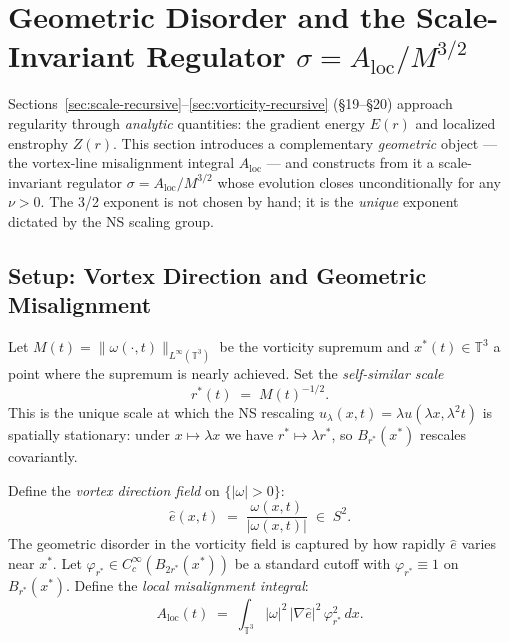 \documentclass[11pt]{article}
\theoremstyle{definition}
\theoremstyle{remark}
\newcommand{\T}{\mathbb{T}}
\begin{document}
\section{Geometric Disorder and the Scale-Invariant Regulator
         \texorpdfstring{$\sigma = A_{\mathrm{loc}}/M^{3/2}$}{sigma}}
\label{sec:sigma-regulator}

\noindent
Sections~\ref{sec:scale-recursive}--\ref{sec:vorticity-recursive} (§19--§20)
approach regularity through \emph{analytic} quantities: the gradient energy $E(r)$
and localized enstrophy $Z(r)$.  This section introduces a complementary
\emph{geometric} object — the vortex-line misalignment integral $A_{\mathrm{loc}}$
— and constructs from it a scale-invariant regulator $\sigma = A_{\mathrm{loc}}/M^{3/2}$
whose evolution closes unconditionally for any $\nu > 0$.  The 3/2 exponent is not
chosen by hand; it is the \emph{unique} exponent dictated by the NS scaling group.

\subsection{Setup: Vortex Direction and Geometric Misalignment}

Let $M(t) = \|\omega(\cdot,t)\|_{L^\infty(\T^3)}$ be the vorticity supremum and
$x^*(t)\in\T^3$ a point where the supremum is nearly achieved.  Set the
\emph{self-similar scale}
\begin{equation}\label{eq:r-star-def}
  r^*(t) \;=\; M(t)^{-1/2}.
\end{equation}
This is the unique scale at which the NS rescaling $u_\lambda(x,t)=\lambda u(\lambda
x,\lambda^2 t)$ is spatially stationary: under $x\mapsto\lambda x$ we have
$r^*\mapsto\lambda r^*$, so $B_{r^*}(x^*)$ rescales covariantly.

Define the \emph{vortex direction field} on $\{|\omega|>0\}$:
\begin{equation}\label{eq:e-hat-def}
  \hat{e}(x,t) \;=\; \frac{\omega(x,t)}{|\omega(x,t)|} \;\in\; S^2.
\end{equation}
The geometric disorder in the vorticity field is captured by how rapidly $\hat{e}$
varies near $x^*$.  Let $\varphi_{r^*}\in C_c^\infty(B_{2r^*}(x^*))$ be a standard
cutoff with $\varphi_{r^*}\equiv 1$ on $B_{r^*}(x^*)$.  Define the
\emph{local misalignment integral}:
\begin{equation}\label{eq:A-loc-def}
  A_{\mathrm{loc}}(t) \;=\; \int_{\T^3} |\omega|^2\,|\nabla\hat{e}|^2\,\varphi_{r^*}^2\,dx.
\end{equation}
\end{document}
